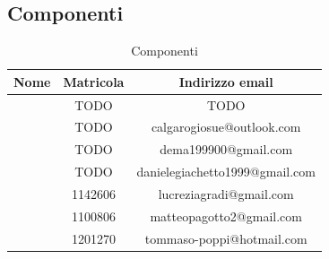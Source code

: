 \subsection{Componenti}

\renewcommand{\arraystretch}{1}
	\begin{table}[H]
		\begin{center}
			\setlength{\aboverulesep}{0pt}
			\setlength{\belowrulesep}{0pt}
			\setlength{\extrarowheight}{.75ex}
			\begin{tabular}{ c c c }
				\rowcolor{AzzurroGruppo!30} 
				\textbf{Nome} & \textbf{Matricola} & \textbf{Indirizzo email}\\
				\toprule
				
				\Davide{} & TODO & TODO \\
				\Giosue{} & TODO & calgarogiosue@outlook.com \\
				\Francesco{} & TODO & dema199900@gmail.com \\
				\Daniele{} & TODO & danielegiachetto1999@gmail.com \\
				\Lucrezia{} & 1142606 & lucreziagradi@gmail.com \\
				\Matteo{} & 1100806 & matteopagotto2@gmail.com \\
				\Tommaso{} & 1201270 & tommaso-poppi@hotmail.com \\
				
				\bottomrule
			\end{tabular}
			\caption{Componenti}
		\end{center}
    \end{table}
